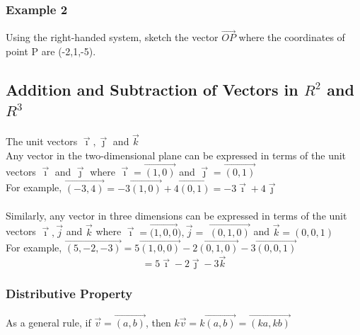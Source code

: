 \documentclass{article}
\begin{document}
\subsubsection*{Example 2} Using the right-handed system, sketch the vector $\overrightarrow{OP}$ where the coordinates of point P are (-2,1,-5).
\begin{center}
\centering
{}
\end{center}

\subsection{Addition and Subtraction of Vectors in $R^2$ and $R^3$}

The unit vectors $\vec{\imath}, \vec{\jmath}$ and $\vec{k}$\\
Any vector in the two-dimensional plane can be expressed in terms of the unit vectors $\vec{\imath}$ and $\vec{\jmath}$ where $\vec{\imath}=\overrightarrow{(1,0)}$ and $\vec{\jmath}=\overrightarrow{(0,1)}$\\

For example, $\overrightarrow{(-3,4)}=-3 \overrightarrow{(1,0)}+4 \overrightarrow{(0,1)}=-3 \vec{\imath}+4 \vec{\jmath}$\\\\
Similarly, any vector in three dimensions can be expressed in terms of the unit vectors $\vec{\imath}, \vec{j}$ and $\vec{k}$ where $\vec{\imath}=\overrightarrow{(1,0,0}), \vec{j}=$ $\overrightarrow{(0,1,0)}$ and $\vec{k}=(0,0,1)$\\


For example, $\overrightarrow{(5,-2,-3)}=5 \overrightarrow{(1,0,0)}-2 \overrightarrow{(0,1,0)}-3 \overrightarrow{(0,0,1)}$
$$
=5 \vec{\imath}-2 \vec{\jmath}-3 \vec{k}
$$

\subsubsection{Distributive Property}
As a general rule, if $\vec{v}=\overrightarrow{(a, b)}$, then $k \vec{v}=k \overrightarrow{(a, b)}=\overrightarrow{(k a, k b)}$\\
\end{document}
